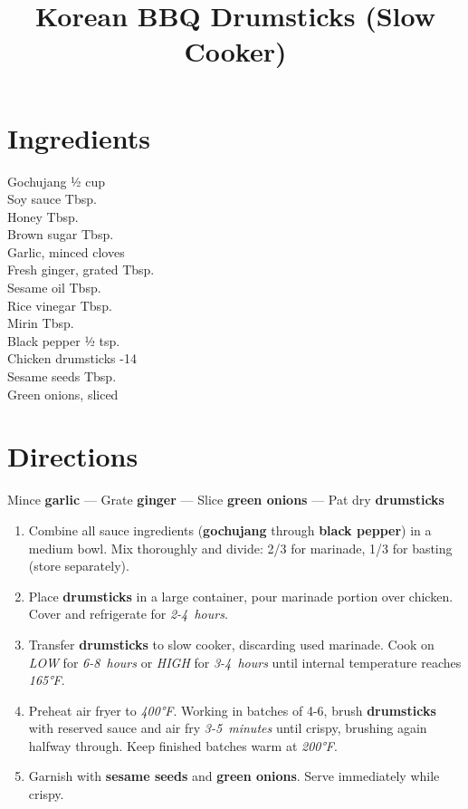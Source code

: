 \documentclass[11pt,letterpaper]{article}
\title{Korean BBQ Drumsticks (Slow Cooker)}
\author{}
\date{}
\begin{document}
\maketitle
\thispagestyle{empty}

\section*{Ingredients}
\setlength{\columnsep}{20pt}
\begin{multicols}{2}
\noindent
    Gochujang \dotfill ½ cup \\
    Soy sauce  Tbsp. \\
    Honey  Tbsp. \\
    Brown sugar  Tbsp. \\
    Garlic, minced  cloves \\
    Fresh ginger, grated  Tbsp. \\
    Sesame oil  Tbsp. \\
    Rice vinegar  Tbsp. \\
    \columnbreak
    Mirin  Tbsp. \\
    Black pepper \dotfill ½ tsp. \\
    Chicken drumsticks -14 \\
    Sesame seeds  Tbsp. \\
    Green onions, sliced  \\
\end{multicols}

\section*{Directions}

\noindent
Mince \textbf{garlic} ---
Grate \textbf{ginger} ---
Slice \textbf{green onions} ---
Pat dry \textbf{drumsticks}

\begin{enumerate}
    \item Combine all sauce ingredients (\textbf{gochujang} through \textbf{black pepper}) in a medium bowl. Mix thoroughly and divide: 2/3 for marinade, 1/3 for basting (store separately).
    
    \item Place \textbf{drumsticks} in a large container, pour marinade portion over chicken. Cover and refrigerate for \textit{2-4~hours}.
    
    \item Transfer \textbf{drumsticks} to slow cooker, discarding used marinade. Cook on \textit{LOW} for \textit{6-8~hours} or \textit{HIGH} for \textit{3-4~hours} until internal temperature reaches \textit{165°F}.
    
    \item Preheat air fryer to \textit{400°F}. Working in batches of 4-6, brush \textbf{drumsticks} with reserved sauce and air fry \textit{3-5~minutes} until crispy, brushing again halfway through. Keep finished batches warm at \textit{200°F}.
    
    \item Garnish with \textbf{sesame seeds} and \textbf{green onions}. Serve immediately while crispy.
\end{enumerate}
\end{document}
